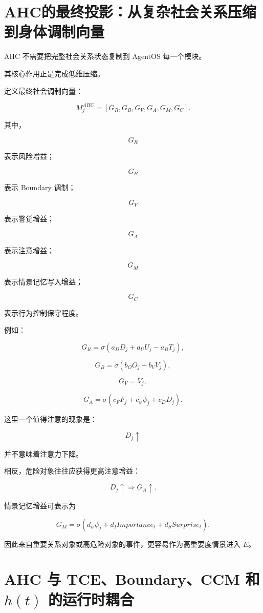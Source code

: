 \section{AHC的最终投影：从复杂社会关系压缩到身体调制向量}

AHC 不需要把完整社会关系状态复制到 AgentOS 每一个模块。

其核心作用正是完成低维压缩。

定义最终社会调制向量：

\[
\boxed{
M_j^{AHC}
=
[
G_R,
G_B,
G_V,
G_A,
G_M,
G_C
].
}
\]

其中，

\[
G_R
\]

表示风险增益；

\[
G_B
\]

表示 Boundary 调制；

\[
G_V
\]

表示警觉增益；

\[
G_A
\]

表示注意增益；

\[
G_M
\]

表示情景记忆写入增益；

\[
G_C
\]

表示行为控制保守程度。

例如：

\[
G_R
=
\sigma
\left(
a_DD_j
+
a_UU_j
-
a_BT_j
\right),
\]

\[
G_B
=
\sigma
\left(
b_OO_j
-
b_VV_j
\right),
\]

\[
G_V=V_j,
\]

\[
G_A
=
\sigma
\left(
c_FF_j
+
c_\psi\psi_j
+
c_DD_j
\right).
\]

这里一个值得注意的现象是：

\[
D_j\uparrow
\]

并不意味着注意力下降。

相反，危险对象往往应获得更高注意增益：

\[
D_j\uparrow
\Rightarrow
G_A\uparrow.
\]

情景记忆增益可表示为

\[
G_M
=
\sigma
\left(
d_\psi\psi_j
+
d_IImportance_t
+
d_SSurprise_t
\right).
\]

因此来自重要关系对象或高危险对象的事件，更容易作为高重要度情景进入 $E$。


\section{AHC 与 TCE、Boundary、CCM 和 $h(t)$ 的运行时耦合}

